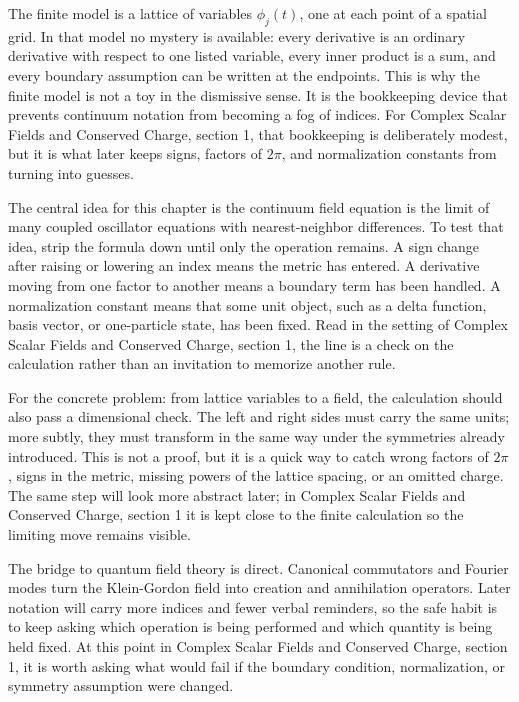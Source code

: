 The finite model is a lattice of variables \(\phi_j(t)\), one at each point of a spatial grid.  In that model no mystery is available: every derivative is an ordinary derivative with respect to one listed variable, every inner product is a sum, and every boundary assumption can be written at the endpoints.  This is why the finite model is not a toy in the dismissive sense.  It is the bookkeeping device that prevents continuum notation from becoming a fog of indices.  For Complex Scalar Fields and Conserved Charge, section 1, that bookkeeping is deliberately modest, but it is what later keeps signs, factors of \(2\pi\), and normalization constants from turning into guesses.

The central idea for this chapter is the continuum field equation is the limit of many coupled oscillator equations with nearest-neighbor differences.  To test that idea, strip the formula down until only the operation remains.  A sign change after raising or lowering an index means the metric has entered.  A derivative moving from one factor to another means a boundary term has been handled.  A normalization constant means that some unit object, such as a delta function, basis vector, or one-particle state, has been fixed.  Read in the setting of Complex Scalar Fields and Conserved Charge, section 1, the line is a check on the calculation rather than an invitation to memorize another rule.

For the concrete problem: from lattice variables to a field, the calculation should also pass a dimensional check.  The left and right sides must carry the same units; more subtly, they must transform in the same way under the symmetries already introduced.  This is not a proof, but it is a quick way to catch wrong factors of \(2\pi\), signs in the metric, missing powers of the lattice spacing, or an omitted charge.  The same step will look more abstract later; in Complex Scalar Fields and Conserved Charge, section 1 it is kept close to the finite calculation so the limiting move remains visible.

The bridge to quantum field theory is direct.  Canonical commutators and Fourier modes turn the Klein-Gordon field into creation and annihilation operators.  Later notation will carry more indices and fewer verbal reminders, so the safe habit is to keep asking which operation is being performed and which quantity is being held fixed.  At this point in Complex Scalar Fields and Conserved Charge, section 1, it is worth asking what would fail if the boundary condition, normalization, or symmetry assumption were changed.

